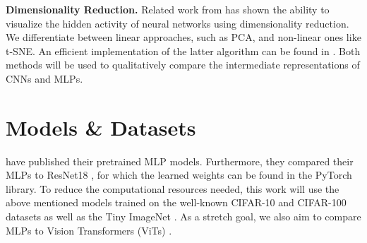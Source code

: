 \documentclass{article}
\theoremstyle{plain}
\theoremstyle{definition}
\theoremstyle{remark}
\begin{document}
\textbf{Dimensionality Reduction.}
Related work from \citet{7539329} has shown the ability to visualize the hidden activity of neural networks using dimensionality reduction. We differentiate between linear approaches, such as PCA, and non-linear ones like t-SNE. An efficient implementation of the latter algorithm can be found in \citet{JMLR:v15:vandermaaten14a}. Both methods will be used to qualitatively compare the intermediate representations of CNNs and MLPs.

\section{Models \& Datasets}
\citet{bachmann2023scaling} have published their pretrained MLP models. Furthermore, they compared their MLPs to ResNet18 \cite{he2015deep}, for which the learned weights can be found in the PyTorch library. 
To reduce the computational resources needed, this work will use the above mentioned models trained on the well-known CIFAR-10 and CIFAR-100 \cite{Krizhevsky2009LearningML} datasets as well as the Tiny ImageNet \cite{Le2015TinyIV}. As a stretch goal, we also aim to compare MLPs to Vision Transformers (ViTs) \cite{dosovitskiy2021image}.



\end{document}
